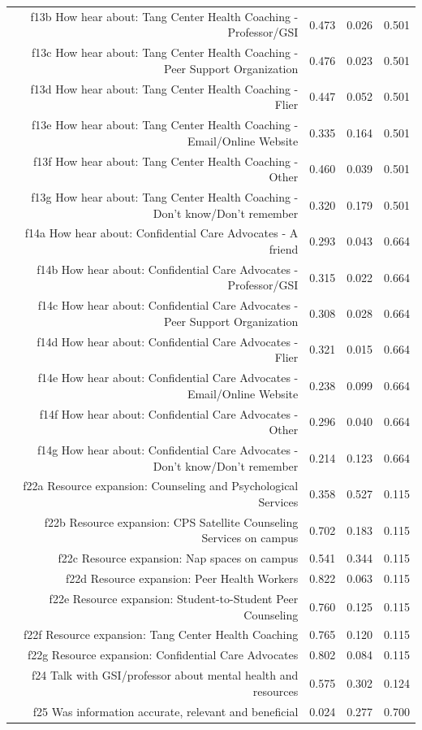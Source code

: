 \documentclass{article}\usepackage[]{graphicx}\usepackage[]{color}
\begin{document}
\begin{table}[H]
{\begin{tabular}{rrrr}
  f13b How hear about: Tang Center Health Coaching - Professor/GSI & 0.473 & 0.026 & 0.501 \\ 
  f13c How hear about: Tang Center Health Coaching - Peer Support Organization & 0.476 & 0.023 & 0.501 \\ 
  f13d How hear about: Tang Center Health Coaching - Flier & 0.447 & 0.052 & 0.501 \\ 
  f13e How hear about: Tang Center Health Coaching - Email/Online Website & 0.335 & 0.164 & 0.501 \\ 
  f13f How hear about: Tang Center Health Coaching - Other & 0.460 & 0.039 & 0.501 \\ 
  f13g How hear about: Tang Center Health Coaching - Don't know/Don't remember & 0.320 & 0.179 & 0.501 \\ 
  f14a How hear about: Confidential Care Advocates - A friend & 0.293 & 0.043 & 0.664 \\ 
  f14b How hear about: Confidential Care Advocates - Professor/GSI & 0.315 & 0.022 & 0.664 \\ 
  f14c How hear about: Confidential Care Advocates - Peer Support Organization & 0.308 & 0.028 & 0.664 \\ 
  f14d How hear about: Confidential Care Advocates - Flier & 0.321 & 0.015 & 0.664 \\ 
  f14e How hear about: Confidential Care Advocates - Email/Online Website & 0.238 & 0.099 & 0.664 \\ 
  f14f How hear about: Confidential Care Advocates - Other & 0.296 & 0.040 & 0.664 \\ 
  f14g How hear about: Confidential Care Advocates - Don't know/Don't remember & 0.214 & 0.123 & 0.664 \\ 
  f22a Resource expansion: Counseling and Psychological Services & 0.358 & 0.527 & 0.115 \\ 
  f22b Resource expansion: CPS Satellite Counseling Services on campus & 0.702 & 0.183 & 0.115 \\ 
  f22c Resource expansion: Nap spaces on campus & 0.541 & 0.344 & 0.115 \\ 
  f22d Resource expansion: Peer Health Workers & 0.822 & 0.063 & 0.115 \\ 
  f22e Resource expansion: Student-to-Student Peer Counseling & 0.760 & 0.125 & 0.115 \\ 
  f22f Resource expansion: Tang Center Health Coaching & 0.765 & 0.120 & 0.115 \\ 
  f22g Resource expansion: Confidential Care Advocates & 0.802 & 0.084 & 0.115 \\ 
  f24 Talk with GSI/professor about mental health and resources & 0.575 & 0.302 & 0.124 \\ 
  f25 Was information accurate, relevant and beneficial & 0.024 & 0.277 & 0.700 \\ 
   \hline
\end{tabular}
}
\end{table}
\end{document}
